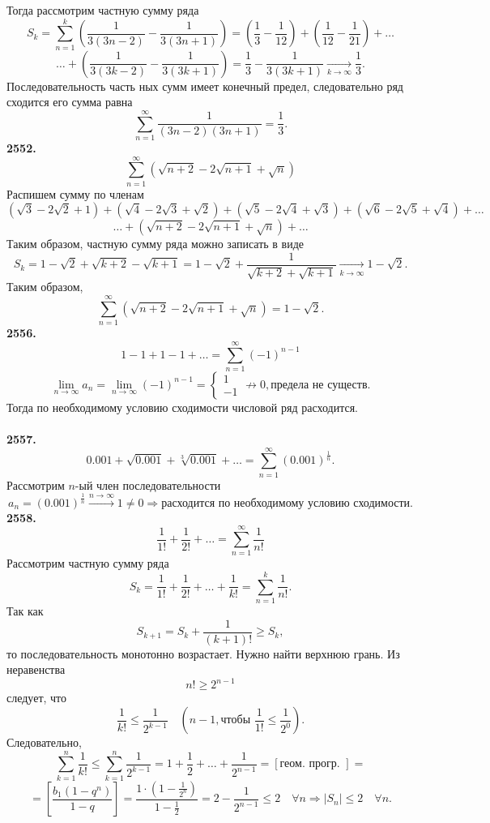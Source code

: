 \documentclass[a4paper, 12pt]{report}
\numberwithin{equation}{section}
\begin{document}
	Тогда рассмотрим частную сумму ряда
	$$ S_k = \sum_{n=1}^{k} \left( \frac{1}{3(3n-2)} - \frac{1}{3(3n+1)} \right) = \left( \frac{1}{3} - \frac{1}{12} \right) + \left( \frac{1}{12} - \frac{1}{21} \right) + \dots $$
	$$ \dots + \left( \frac{1}{3(3k-2)} - \frac{1}{3(3k+1)} \right) = \frac{1}{3} - \frac{1}{3(3k+1)} \xrightarrow[k \to \infty]{} \frac{1}{3}.$$
	Последовательность часть ных сумм имеет конечный предел, следовательно ряд сходится его сумма равна
	$$ \sum_{n=1}^{\infty} \frac{1}{(3n-2)(3n+1)} = \frac{1}{3}.$$
	\textbf{2552.}
	$$ \sum_{n=1}^{\infty} (\sqrt{n+2} - 2\sqrt{n+1} + \sqrt{n})$$ 
	Распишем сумму по членам
	$$(\sqrt{3} - 2\sqrt{2} + 1) + (\sqrt{4} - 2\sqrt{3} + \sqrt{2}) + (\sqrt{5} - 2\sqrt{4} + \sqrt{3}) + (\sqrt{6} - 2\sqrt{5} + \sqrt{4}) + \dots $$ $$\ldots + (\sqrt{n+2} - 2\sqrt{n+1} + \sqrt{n}) + \dots $$
	Таким образом, частную сумму ряда можно записать в виде
	$$ S_k = 1 - \sqrt{2} + \sqrt{k+2} - \sqrt{k+1} = 1 - \sqrt{2} + \frac{1}{\sqrt{k+2} + \sqrt{k+1}} \xrightarrow[k \to \infty]{} 1-\sqrt{2}.$$
	Таким образом,
	$$ \sum_{n=1}^{\infty} (\sqrt{n+2} - 2\sqrt{n+1} + \sqrt{n}) = 1 - \sqrt{2}.$$
	\textbf{2556.}
	$$ 1-1+1-1+\dots = \sum_{n=1}^{\infty} (-1)^{n-1} $$
	$$ \lim_{n \to \infty} a_n = \lim_{n \to \infty} (-1)^{n-1} = \begin{cases} 1 \\ -1 \end{cases} \not\to 0, \text{предела не существ.} $$
	Тогда по необходимому условию сходимости числовой ряд расходится.
	\\\\
	\textbf{2557.}
	$$ 0.001 + \sqrt{0.001} + \sqrt[3]{0.001} + \dots = \sum_{n=1}^{\infty} (0.001)^{\frac{1}{n}}.$$
	Рассмотрим $n$-ый член последовательности
	$$ a_n = (0.001)^{\frac{1}{n}} \xrightarrow{n \to \infty} 1 \ne 0 \Rightarrow \text{расходится по необходимому условию сходимости.} $$
	\textbf{2558.}
	$$ \frac{1}{1!} + \frac{1}{2!} + \dots = \sum_{n=1}^{\infty} \frac{1}{n!} $$
	Рассмотрим частную сумму ряда
	$$ S_k = \frac{1}{1!} + \frac{1}{2!} + \dots + \frac{1}{k!} = \sum_{n=1}^{k} \frac{1}{n!}.$$
	Так как
	$$ S_{k+1} = S_k + \frac{1}{(k+1)!} \ge S_k,$$
	то последовательность монотонно возрастает. Нужно найти верхнюю грань.
	Из неравенства $$ n! \ge 2^{n-1} $$ следует, что
	$$ \frac{1}{k!} \le \frac{1}{2^{k-1}} \quad \left(n-1, \text{чтобы } \frac{1}{1!} \le \frac{1}{2^0}\right).$$
	Следовательно,
	$$ \sum_{k=1}^{n} \frac{1}{k!} \le \sum_{k=1}^{n} \frac{1}{2^{k-1}} = 1 + \frac{1}{2} + \dots + \frac{1}{2^{n-1}} = [\text{геом. прогр. }] = $$
	$$ = \left[ \frac{b_1(1-q^n)}{1-q} \right] = \frac{1 \cdot (1-\frac{1}{2^n})}{1-\frac{1}{2}} = 2 - \frac{1}{2^{n-1}} \le 2 \quad \forall n \Rightarrow |S_n| \le 2 \quad \forall n. $$
\end{document}
